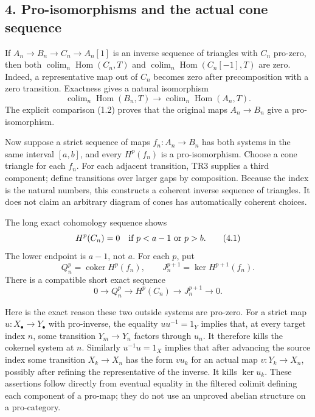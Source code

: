 \documentclass[11pt]{article}
\begin{document}
\subsection{4. Pro-isomorphisms and the actual cone sequence}\label{proofs-12380-12604-pro-isomorphisms-and-the-actual-cone-sequence}

If \(A_n\to B_n\to C_n\to A_n[1]\) is an inverse sequence of triangles with \(C_n\) pro-zero,\allowbreak{} then both \(\operatorname{colim}_n\operatorname{Hom}(C_n,T)\) and \(\operatorname{colim}_n\operatorname{Hom}(C_n[-1],T)\) are zero. Indeed,\allowbreak{} a representative map out of \(C_n\) becomes zero after precomposition with a zero transition. Exactness gives a natural isomorphism \[
\operatorname{colim}_n\operatorname{Hom}(B_n,T)
 \longrightarrow\operatorname{colim}_n\operatorname{Hom}(A_n,T).
\] The explicit comparison (1.2)\allowbreak{} proves that the original maps \(A_n\to B_n\) give a pro-isomorphism.

Now suppose a strict sequence of maps \(f_n:A_n\to B_n\) has both systems in the same interval \([a,b]\),\allowbreak{} and every \(H^p(f_n)\) is a pro-isomorphism. Choose a cone triangle for each \(f_n\). For each adjacent transition,\allowbreak{} TR3 supplies a third component; define transitions over larger gaps by composition. Because the index is the natural numbers,\allowbreak{} this constructs a coherent inverse sequence of triangles. It does not claim an arbitrary diagram of cones has automatically coherent choices.

The long exact cohomology sequence shows \[
H^p(C_n)=0\quad\hbox{if }p<a-1\hbox{ or }p>b. \tag{4.1}
\] The lower endpoint is \(a-1\),\allowbreak{} not \(a\). For each \(p\),\allowbreak{} put \[
Q_n^p=\operatorname{coker}H^p(f_n),\qquad
J_n^{p+1}=\ker H^{p+1}(f_n).
\] There is a compatible short exact sequence \[
0\longrightarrow Q_n^p\longrightarrow H^p(C_n)
 \longrightarrow J_n^{p+1}\longrightarrow0. \tag{4.2}
\]

Here is the exact reason these two outside systems are pro-zero. For a strict map \(u:X_\bullet\to Y_\bullet\) with pro-inverse,\allowbreak{} the equality \(u u^{-1}=1_Y\) implies that,\allowbreak{} at every target index \(n\),\allowbreak{} some transition \(Y_m\to Y_n\) factors through \(u_n\). It therefore kills the cokernel system at \(n\). Similarly \(u^{-1}u=1_X\) implies that after advancing the source index some transition \(X_k\to X_n\) has the form \(v u_k\) for an actual map \(v:Y_k\to X_n\),\allowbreak{} possibly after refining the representative of the inverse. It kills \(\ker u_k\). These assertions follow directly from eventual equality in the filtered colimit defining each component of a pro-map; they do not use an unproved abelian structure on a pro-category.
\end{document}
